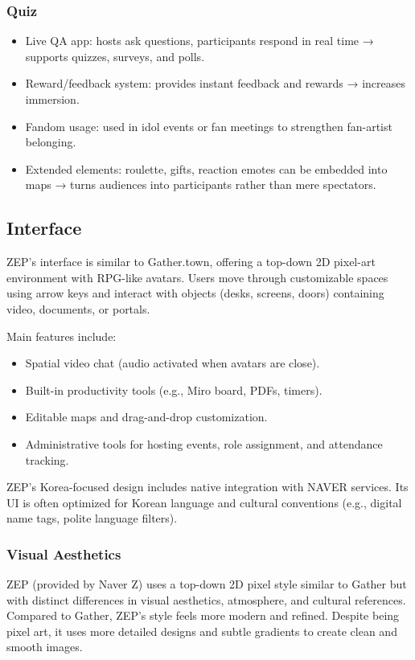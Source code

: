 \subsubsection{Quiz}
\begin{itemize}
    \item Live QA app: hosts ask questions, participants respond in real time → supports quizzes, surveys, and polls.  
    \item Reward/feedback system: provides instant feedback and rewards → increases immersion.  
    \item Fandom usage: used in idol events or fan meetings to strengthen fan-artist belonging.  
    \item Extended elements: roulette, gifts, reaction emotes can be embedded into maps → turns audiences into participants rather than mere spectators.  
\end{itemize}

\subsection{Interface}
ZEP’s interface is similar to Gather.town, offering a top-down 2D pixel-art environment with RPG-like avatars. Users move through customizable spaces using arrow keys and interact with objects (desks, screens, doors) containing video, documents, or portals.  

Main features include:
\begin{itemize}
    \item Spatial video chat (audio activated when avatars are close).  
    \item Built-in productivity tools (e.g., Miro board, PDFs, timers).  
    \item Editable maps and drag-and-drop customization.  
    \item Administrative tools for hosting events, role assignment, and attendance tracking.  
\end{itemize}

ZEP’s Korea-focused design includes native integration with NAVER services. Its UI is often optimized for Korean language and cultural conventions (e.g., digital name tags, polite language filters).  

\subsubsection{Visual Aesthetics}
ZEP (provided by Naver Z) uses a top-down 2D pixel style similar to Gather but with distinct differences in visual aesthetics, atmosphere, and cultural references. Compared to Gather, ZEP’s style feels more modern and refined. Despite being pixel art, it uses more detailed designs and subtle gradients to create clean and smooth images.  

